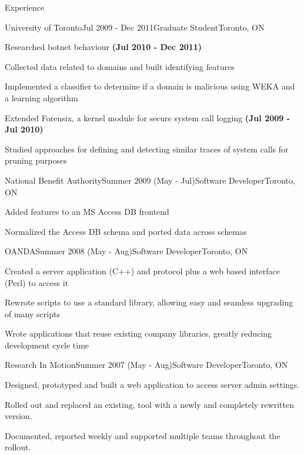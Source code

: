 \documentclass{resume}
\begin{document}
\begin{rSection}{Experience}
    \begin{rSubsection}{University of Toronto}{Jul 2009 - Dec 2011}{Graduate Student}{Toronto, ON}
      \item Researched botnet behaviour \textbf{(Jul 2010 - Dec 2011)}
      \item Collected data related to domains and built identifying features
      \item Implemented a classifier to determine if a domain is malicious using WEKA and a learning algorithm
      \vspace{1ex}
      \item Extended Forensix, a kernel module for secure system call logging \textbf{(Jul 2009 - Jul 2010)}
      \item Studied approaches for defining and detecting similar traces of system calls for pruning purposes
    \end{rSubsection}

    \begin{rSubsection}{National Benefit Authority}{Summer 2009 (May - Jul)}{Software Developer}{Toronto, ON}
      \item Added features to an MS Access DB frontend
      \item Normalized the Access DB schema and ported data across schemas
    \end{rSubsection}

    \begin{rSubsection}{OANDA}{Summer 2008 (May - Aug)}{Software Developer}{Toronto, ON}
      \item Created a server application (C++) and protocol plus a web based interface (Perl) to access it
      \item Rewrote scripts to use a standard library, allowing easy and seamless upgrading of many scripts
      \item Wrote applications that reuse existing company libraries, greatly reducing development cycle time
      \begin{comment}
        \item Added features to existing code, extending an existing Perl script 
        \item Learned to write object oriented Perl libraries and gained experience writing very OOP C++ code
      \end{comment}
    \end{rSubsection}

    \begin{rSubsection}{Research In Motion}{Summer 2007 (May - Aug)}{Software Developer}{Toronto, ON}
      \item Designed, prototyped and built a web application to access server admin settings.
      \item Rolled out and replaced an existing, tool with a newly and completely rewritten version.
      \item Documented, reported weekly and supported multiple teams throughout the rollout.


\end{rSubsection}
\end{rSection}
\end{document}
